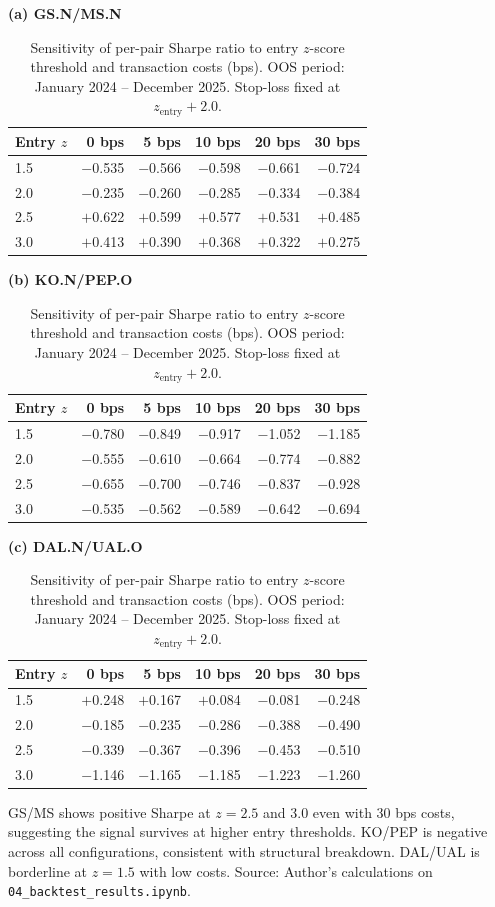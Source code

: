 \documentclass[a4paper]{report}
\begin{document}
\begin{table}[htbp]
\centering
\caption{Sensitivity of per-pair Sharpe ratio to entry $z$-score threshold and transaction
costs (bps). OOS period: January 2024 -- December 2025. Stop-loss fixed at $z_{\text{entry}} + 2.0$.\\}
\label{tab:sensitivity}

\medskip
\textbf{(a) GS.N/MS.N}

\smallskip
\begin{tabular}{lrrrrr}
\toprule
Entry $z$ & 0 bps & 5 bps & 10 bps & 20 bps & 30 bps \\
\midrule
1.5 & $-$0.535 & $-$0.566 & $-$0.598 & $-$0.661 & $-$0.724 \\
2.0 & $-$0.235 & $-$0.260 & $-$0.285 & $-$0.334 & $-$0.384 \\
2.5 & $+$0.622 & $+$0.599 & $+$0.577 & $+$0.531 & $+$0.485 \\
3.0 & $+$0.413 & $+$0.390 & $+$0.368 & $+$0.322 & $+$0.275 \\
\bottomrule
\end{tabular}

\medskip
\textbf{(b) KO.N/PEP.O}

\smallskip
\begin{tabular}{lrrrrr}
\toprule
Entry $z$ & 0 bps & 5 bps & 10 bps & 20 bps & 30 bps \\
\midrule
1.5 & $-$0.780 & $-$0.849 & $-$0.917 & $-$1.052 & $-$1.185 \\
2.0 & $-$0.555 & $-$0.610 & $-$0.664 & $-$0.774 & $-$0.882 \\
2.5 & $-$0.655 & $-$0.700 & $-$0.746 & $-$0.837 & $-$0.928 \\
3.0 & $-$0.535 & $-$0.562 & $-$0.589 & $-$0.642 & $-$0.694 \\
\bottomrule
\end{tabular}

\medskip
\textbf{(c) DAL.N/UAL.O}

\smallskip
\begin{tabular}{lrrrrr}
\toprule
Entry $z$ & 0 bps & 5 bps & 10 bps & 20 bps & 30 bps \\
\midrule
1.5 & $+$0.248 & $+$0.167 & $+$0.084 & $-$0.081 & $-$0.248 \\
2.0 & $-$0.185 & $-$0.235 & $-$0.286 & $-$0.388 & $-$0.490 \\
2.5 & $-$0.339 & $-$0.367 & $-$0.396 & $-$0.453 & $-$0.510 \\
3.0 & $-$1.146 & $-$1.165 & $-$1.185 & $-$1.223 & $-$1.260 \\
\bottomrule
\end{tabular}   %

\smallskip
\begin{minipage}{0.95\linewidth}
\small GS/MS shows positive Sharpe at $z = 2.5$ and $3.0$ even with 30 bps costs,
suggesting the signal survives at higher entry thresholds. KO/PEP is negative
across all configurations, consistent with structural breakdown. DAL/UAL is
borderline at $z = 1.5$ with low costs.
Source: Author's calculations on \texttt{04\_backtest\_results.ipynb}.
\end{minipage}

\end{table}
\end{document}
